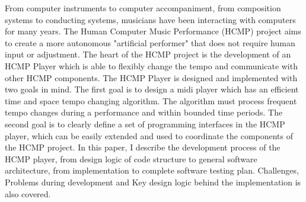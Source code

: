 


\begin{abstracts}
From computer instruments to computer accompaniment, from composition
systems to conducting systems, musicians have been interacting with
computers for many years. The Human Computer Music Performance (HCMP)
project aims to create a more autonomous "artificial  performer" that does
not require human input or adjustment.  The heart of the HCMP project is the
development of an HCMP Player which is able to flexibly change the tempo and
communicate with other HCMP components.
The HCMP Player is designed and implemented with two goals in mind. The
first goal is to design a midi player which has an efficient time and space
tempo changing algorithm. The algorithm must process frequent tempo changes
during a performance and within bounded time periods. The second goal is to
clearly define a set of programming interfaces in the HCMP player, which can
be easily extended and used to coordinate the components of the HCMP
project. In this paper, I describe the development process of the HCMP
player, from design logic of code structure to general software
architecture, from implementation to complete software testing plan.
Challenges, Problems during development and Key design logic behind the
implementation is also covered.
\end{abstracts}

